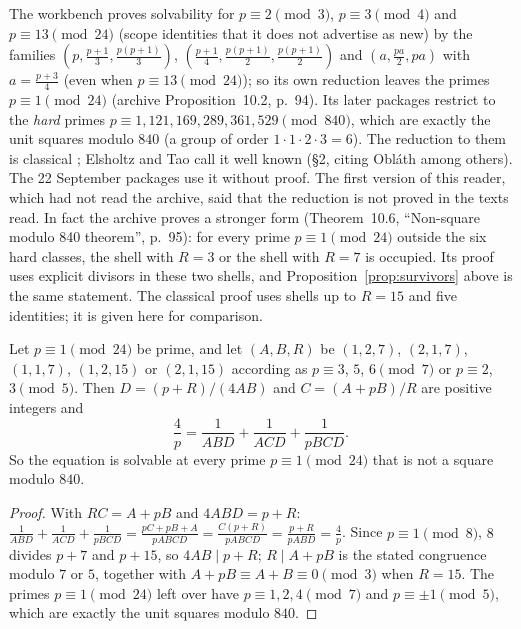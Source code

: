 The workbench proves solvability for $p\equiv2\pmod 3$, $p\equiv3\pmod4$ and $p\equiv13\pmod{24}$ (scope identities that it does not advertise as new) by the families $(p,\frac{p+1}3,\frac{p(p+1)}3)$, $(\frac{p+1}4,\frac{p(p+1)}2,\frac{p(p+1)}2)$ and $(a,\frac{pa}2,pa)$ with $a=\frac{p+3}4$ (even when $p\equiv13\pmod{24}$); so its own reduction leaves the primes $p\equiv1\pmod{24}$ (archive Proposition~10.2, p.~94). Its later packages restrict to the \emph{hard} primes $p\equiv1,121,169,289,361,529\pmod{840}$, which are exactly the unit squares modulo $840$ (a group of order $1\cdot1\cdot2\cdot3=6$). The reduction to them is classical \cite{Mordell,ElsholtzTao}; Elsholtz and Tao call it well known (§2, citing Obláth among others). The 22 September packages use it without proof. The first version of this reader, which had not read the archive, said that the reduction is not proved in the texts read. In fact the archive proves a stronger form (Theorem~10.6, ``Non-square modulo 840 theorem'', p.~95): for every prime $p\equiv1\pmod{24}$ outside the six hard classes, the shell with $R=3$ or the shell with $R=7$ is occupied. Its proof uses explicit divisors in these two shells, and Proposition~\ref{prop:survivors} above is the same statement. The classical proof uses shells up to $R=15$ and five identities; it is given here for comparison.

\begin{proposition}\label{prop:mod840}
Let $p\equiv1\pmod{24}$ be prime, and let $(A,B,R)$ be $(1,2,7)$, $(2,1,7)$, $(1,1,7)$, $(1,2,15)$ or $(2,1,15)$ according as $p\equiv3$, $5$, $6\pmod7$ or $p\equiv2$, $3\pmod5$. Then $D=(p+R)/(4AB)$ and $C=(A+pB)/R$ are positive integers and
\[
\frac4p=\frac1{ABD}+\frac1{ACD}+\frac1{pBCD}.
\]
So the equation is solvable at every prime $p\equiv1\pmod{24}$ that is not a square modulo $840$.
\end{proposition}
\begin{proof}
With $RC=A+pB$ and $4ABD=p+R$: $\frac1{ABD}+\frac1{ACD}+\frac1{pBCD}=\frac{pC+pB+A}{pABCD}=\frac{C(p+R)}{pABCD}=\frac{p+R}{pABD}=\frac4p$. Since $p\equiv1\pmod8$, $8$ divides $p+7$ and $p+15$, so $4AB\mid p+R$; $R\mid A+pB$ is the stated congruence modulo $7$ or $5$, together with $A+pB\equiv A+B\equiv0\pmod3$ when $R=15$. The primes $p\equiv1\pmod{24}$ left over have $p\equiv1,2,4\pmod7$ and $p\equiv\pm1\pmod5$, which are exactly the unit squares modulo $840$.
\end{proof}

